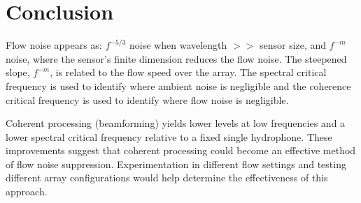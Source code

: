 \documentclass[12pt,journal,onecolumn]{IEEEtran}
\begin{document}
\section{Conclusion}
Flow noise appears as: $f^{-5/3}$ noise when wavelength $>>$ sensor size, and $f^{-m}$ noise, where the sensor's finite dimension reduces the flow noise. The steepened slope, $f^{-m}$, is related to the flow speed over the array. The spectral critical frequency is used to identify where ambient noise is negligible and the coherence critical frequency is used to identify where flow noise is negligible. 

Coherent processing (beamforming) yields lower levels at low frequencies and a lower spectral critical frequency relative to a fixed single hydrophone. These improvements suggest that coherent processing could become an effective method of flow noise suppression. Experimentation in different flow settings and testing different array configurations would help determine the effectiveness of this approach. 


\newpage




%


\end{document}
